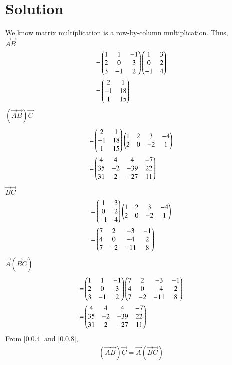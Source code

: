 \documentclass[journal,12pt,twocolumn]{IEEEtran}
\begin{document}
\section*{Solution}
We know matrix multiplication is a row-by-column multiplication. Thus,\\
$\vec{A}\vec{B}$
\begin{align}
    =& \begin{pmatrix}1 & 1 & -1\\2 & 0 & 3\\3 & -1 & 2\end{pmatrix}
    \begin{pmatrix}1 & 3\\0 & 2\\-1 & 4\end{pmatrix}\\
    =& \begin{pmatrix}2 & 1\\-1 & 18\\1 & 15\end{pmatrix}
\end{align}
$(\vec{A}\vec{B})\vec{C}$
\begin{align}
    =& \begin{pmatrix}2 & 1\\-1 & 18\\1 & 15\end{pmatrix}\begin{pmatrix}1 & 2 & 3 & -4\\2 & 0 & -2 & 1\end{pmatrix}\\
    =& \begin{pmatrix}4&4&4&-7\\35&-2&-39&22\\31&2&-27&11\end{pmatrix}\label{0.0.4}
\end{align}
$\vec{B}\vec{C}$
\begin{align}    
    =& \begin{pmatrix}1 & 3\\0 & 2\\-1 & 4\end{pmatrix}\begin{pmatrix}1 & 2 & 3 & -4\\2 & 0 & -2 & 1\end{pmatrix}\\
    =& \begin{pmatrix}7&2&-3&-1\\4&0&-4&2\\7&-2&-11&8\end{pmatrix}
\end{align}
$\vec{A}(\vec{B}\vec{C})$
\begin{align} 
    =& \begin{pmatrix}1 & 1 & -1\\2 & 0 & 3\\3 & -1 & 2\end{pmatrix}\begin{pmatrix}7&2&-3&-1\\4&0&-4&2\\7&-2&-11&8\end{pmatrix}\\
    =& \begin{pmatrix}4&4&4&-7\\35&-2&-39&22\\31&2&-27&11\end{pmatrix}\label{0.0.8}
\end{align}
From \eqref{0.0.4} and \eqref{0.0.8},\\
\begin{align}
    (\vec{A}\vec{B})\vec{C}=\vec{A}(\vec{B}\vec{C})
\end{align}
\end{document}
